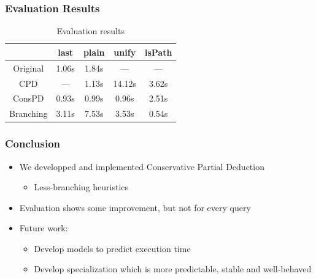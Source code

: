 \documentclass[xcolor=table]{beamer}
\begin{document}
\begin{frame}[fragile]
  \frametitle{Evaluation Results}

  \begin{table}
    \centering
    \begin{tabular}{c||c|c||c||c}
                     & last  & plain & unify  & isPath \\ \hline\hline
    Original         & 1.06s & 1.84s & ---    & ---    \\ \hline
    CPD              & ---   & 1.13s & 14.12s & 3.62s  \\ \hline
    ConsPD           & 0.93s & 0.99s & 0.96s  & 2.51s  \\ \hline
    Branching        & 3.11s & 7.53s & 3.53s  & 0.54s  \\ \hline
    \end{tabular}

    \caption{Evaluation results}
  \end{table}

\end{frame}

\begin{frame}[fragile]
  \frametitle{Conclusion}
  \begin{itemize}
    \item We developped and implemented Conservative Partial Deduction
    \begin{itemize}
      \item Less-branching heuristics
    \end{itemize}
    \item Evaluation shows some improvement, but not for every query
    \item Future work:
    \begin{itemize}
      \item Develop models to predict execution time
      \item Develop specialization which is more predictable, stable and well-behaved
    \end{itemize}
  \end{itemize}
\end{frame}
\end{document}
